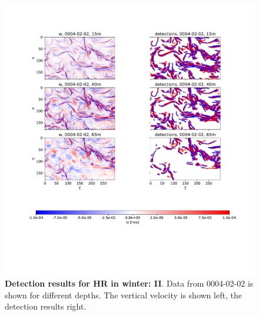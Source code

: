 \begin{figure}
    \centering
    \includegraphics[width=16cm, trim=2.5cm 0 0 2cm]{figures/eval_det_subm_winter2.pdf}
    \caption[Detection results for HR in winter: II]{\textbf{Detection results for HR in winter: II}. Data from 0004-02-02 is shown for different depths. The vertical velocity is shown left, the detection results right.}\label{fig:subm_det_winter2}
\end{figure}

